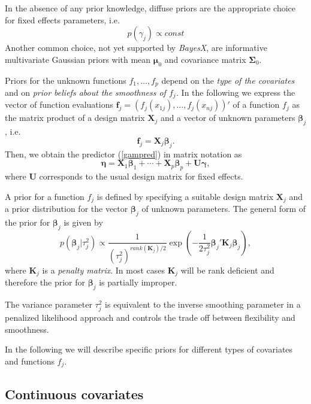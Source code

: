 \documentclass[11pt,a4paper,twoside]{bayesxarticle}
\def \Kvec {\vec{K}}
\def \betavec {\boldsymbol{\beta}}
\def \etavec {\boldsymbol{\eta}}
\def \gammavec {\boldsymbol{\gamma}}
\def \muvec {\boldsymbol{\mu}}
\def \Sigmavec {\boldsymbol{\Sigma}}
\def \fvec {\mathbf{f}}
\def \Kvec {\mathbf{K}}
\def \Uvec {\mathbf{U}}
\def \Xvec {\mathbf{X}}
\begin{document}
In the absence of any prior knowledge, diffuse priors are the
appropriate choice for fixed effects parameters, i.e.
$$
 p(\gamma_j) \propto const
$$
Another common choice, not yet supported by {\em BayesX}, are
informative multivariate Gaussian priors with mean $\muvec_0$ and
covariance matrix $\Sigmavec_0$.


Priors for the unknown functions $f_{1},\dots,f_{p}$ depend on the
{\em type of the covariates} and on {\em prior beliefs about the
smoothness of $f_j$.} In the following we express the vector of
function evaluations $\fvec_j=(f_j(x_{1j}),\dots,f_j(x_{nj}))'$ of a
function $f_j$ as the matrix product of a design matrix $\Xvec_j$ and a
vector of unknown parameters $\betavec_j$, i.e.
\begin{equation}
\label{matproduct} \fvec_j=\Xvec_j \betavec_j.
\end{equation}
Then, we obtain the predictor (\ref{gampred}) in matrix notation
as
\begin{equation}
\label{gampredmatrix} \etavec = \Xvec_1 \betavec_1 + \cdots + \Xvec_p \betavec_p +
\Uvec \gammavec,
\end{equation}
where $\Uvec$ corresponds to the usual design matrix for fixed
effects.

A prior for a function $f_j$ is defined by specifying a suitable
design matrix $\Xvec_j$ and a prior distribution for the vector
$\betavec_j$ of unknown parameters. The general form of the prior for
$\betavec_j$ is given by
\begin{equation}
\label{genform} p(\betavec_j | \tau_j^2) \propto
\frac{1}{(\tau^2_j)^{rank(\Kvec_j)/2}} \exp\left(-\frac{1}{2\tau_j^2}
\betavec_j' \Kvec_j \betavec_j\right),
\end{equation}
where $\Kvec_j$ is a {\em penalty matrix}. In most cases $\Kvec_j$ will be
rank deficient and therefore the prior for $\betavec_j$ is partially improper.

The variance parameter $\tau_j^2$ is  equivalent to the inverse
smoothing parameter in a penalized likelihood approach and controls the
trade off between flexibility and smoothness.

In the following we will describe specific priors for different
types of covariates and functions $f_j$.


\subsection{Continuous covariates}
\label{psplines}
\end{document}
